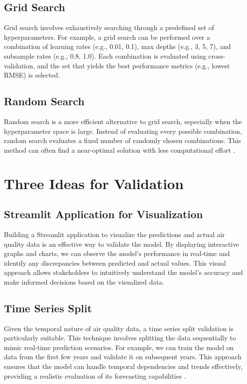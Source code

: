 \subsection{Grid Search}
Grid search involves exhaustively searching through a predefined set of
hyperparameters. For example, a grid search can be performed over a combination
of learning rates (e.g., 0.01, 0.1), max depths (e.g., 3, 5, 7), and subsample rates
(e.g., 0.8, 1.0). Each combination is evaluated using cross-validation, and the
set that yields the best performance metrics (e.g., lowest RMSE) is selected.

\subsection{Random Search}
Random search is a more efficient alternative to grid search, especially when the
hyperparameter space is large. Instead of evaluating every possible combination,
random search evaluates a fixed number of randomly chosen combinations. This
method can often find a near-optimal solution with less computational effort
\cite{Airqindia:2024}.

\section{Three Ideas for Validation}

\subsection{Streamlit Application for Visualization}
Building a Streamlit application to visualize the predictions and actual air quality
data is an effective way to validate the model. By displaying interactive graphs
and charts, we can observe the model's performance in real-time and identify any
discrepancies between predicted and actual values. This visual approach allows
stakeholders to intuitively understand the model's accuracy and make informed
decisions based on the visualized data.

\subsection{Time Series Split}
Given the temporal nature of air quality data, a time series split validation is
particularly suitable. This technique involves splitting the data sequentially
to mimic real-time prediction scenarios. For example, we can train the model on
data from the first few years and validate it on subsequent years. This approach
ensures that the model can handle temporal dependencies and trends effectively,
providing a realistic evaluation of its forecasting capabilities
\cite{Airqindia:2024}.

